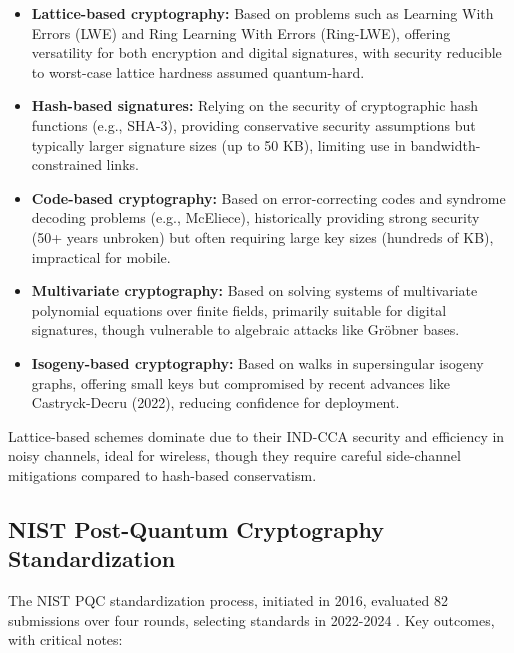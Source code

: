 \documentclass[11pt,a4paper]{article}
\begin{document}
\begin{itemize}
    \item \textbf{Lattice-based cryptography:} Based on problems such as Learning With Errors (LWE) and Ring Learning With Errors (Ring-LWE), offering versatility for both encryption and digital signatures, with security reducible to worst-case lattice hardness assumed quantum-hard.
    
    \item \textbf{Hash-based signatures:} Relying on the security of cryptographic hash functions (e.g., SHA-3), providing conservative security assumptions but typically larger signature sizes (up to 50 KB), limiting use in bandwidth-constrained links.
    
    \item \textbf{Code-based cryptography:} Based on error-correcting codes and syndrome decoding problems (e.g., McEliece), historically providing strong security (50+ years unbroken) but often requiring large key sizes (hundreds of KB), impractical for mobile.
    
    \item \textbf{Multivariate cryptography:} Based on solving systems of multivariate polynomial equations over finite fields, primarily suitable for digital signatures, though vulnerable to algebraic attacks like Gr\"obner bases.
    
    \item \textbf{Isogeny-based cryptography:} Based on walks in supersingular isogeny graphs, offering small keys but compromised by recent advances like Castryck-Decru (2022), reducing confidence for deployment.
\end{itemize}

Lattice-based schemes dominate due to their IND-CCA security and efficiency in noisy channels, ideal for wireless, though they require careful side-channel mitigations compared to hash-based conservatism.

\subsection{NIST Post-Quantum Cryptography Standardization}

The NIST PQC standardization process, initiated in 2016, evaluated 82 submissions over four rounds, selecting standards in 2022-2024 \cite{nist2022}. Key outcomes, with critical notes:
\end{document}
